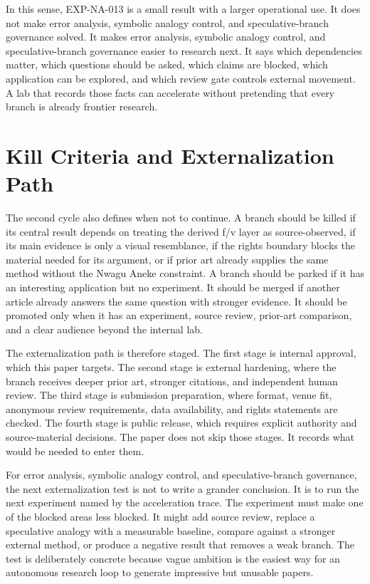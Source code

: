 \documentclass[sigconf,nonacm]{acmart}
\begin{document}
In this sense, EXP-NA-013 is a small result with a larger operational use. It
does not make error analysis, symbolic analogy control, and speculative-branch governance solved. It makes error analysis, symbolic analogy control, and speculative-branch governance easier to research next. It says
which dependencies matter, which questions should be asked, which claims are
blocked, which application can be explored, and which review gate controls
external movement. A lab that records those facts can accelerate without
pretending that every branch is already frontier research.

\section{Kill Criteria and Externalization Path}
The second cycle also defines when not to continue. A branch should be killed if
its central result depends on treating the derived f/v layer as source-observed,
if its main evidence is only a visual resemblance, if the rights boundary blocks
the material needed for its argument, or if prior art already supplies the same
method without the Nwagu Aneke constraint. A branch should be parked if it has
an interesting application but no experiment. It should be merged if another
article already answers the same question with stronger evidence. It should be
promoted only when it has an experiment, source review, prior-art comparison,
and a clear audience beyond the internal lab.

The externalization path is therefore staged. The first stage is internal
approval, which this paper targets. The second stage is external hardening, where
the branch receives deeper prior art, stronger citations, and independent human
review. The third stage is submission preparation, where format, venue fit,
anonymous review requirements, data availability, and rights statements are
checked. The fourth stage is public release, which requires explicit authority
and source-material decisions. The paper does not skip those stages. It records
what would be needed to enter them.

For error analysis, symbolic analogy control, and speculative-branch governance, the next externalization test is not to write a grander conclusion.
It is to run the next experiment named by the acceleration trace. The experiment
must make one of the blocked areas less blocked. It might add source review,
replace a speculative analogy with a measurable baseline, compare against a
stronger external method, or produce a negative result that removes a weak
branch. The test is deliberately concrete because vague ambition is the easiest
way for an autonomous research loop to generate impressive but unusable papers.
\end{document}
